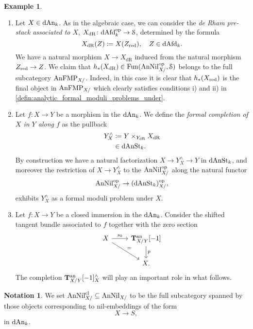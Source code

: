 \documentclass[10pt,a4paper,reqno]{amsart} %
\theoremstyle{plain}
\theoremstyle{definition}
\newtheorem{notation}[thm]{Notation}
\newtheorem{eg}[thm]{Example}
\theoremstyle{remark}
\numberwithin{equation}{section}
\begin{document}
\begin{eg}
    \begin{enumerate}
        \item Let $X \in \mathrm{dAn}_k$. As in the algebraic case, we can consider the \emph{de Rham pre-stack associated to $X$}, $X_\mathrm{dR} \colon \mathrm{dAfd}_k^\mathrm{op} \to \mathcal S$,
        determined by the formula
            \[
                X_{\mathrm{dR}}(Z) \coloneqq X(Z_{\mathrm{red}}), \quad Z \in \mathrm{dAfd}_k.  
            \]
        We have a natural morphism $X \to X_\mathrm{dR}$ induced from the natural morphism $Z_{\mathrm{red}} \to Z$.
        We claim that $h_*(X_\mathrm{dR}) \in \operatorname{Fun}(\mathrm{AnNil}_{X/}^\mathrm{op}, \mathcal S)$ belongs to the full subcategory $\mathrm{AnFMP}_{X/}$. Indeed, in this case it is clear that
        $h_*(X_{\mathrm{red}})$ is the final object in $\mathrm{AnFMP}_{X/}$ which clearly satisfies conditions i) and ii) in \cref{defin:analytic_formal_moduli_problems_under}.
        \item Let $f \colon X \to Y$ be a morphism in the \infcat $\mathrm{dAn}_k$. We define the \emph{formal completion of $X$ in $Y$ along $f$} as the pullback 
            \begin{align*}
                Y^\wedge_X  & \coloneqq Y \times_{Y_\mathrm{dR}} X_\mathrm{dR} \\
                            & \in \mathrm{dAnSt}_k.
            \end{align*}
        By construction we have a natural factorization $X \to Y^\wedge_X \to Y$ in $\mathrm{dAnSt}_k$, and moreover the restriction of $X \to Y^\wedge_X$ to the \infcat
        $\mathrm{AnNil}^\mathrm{op}_{X/}$ along the natural functor
            \[
                \mathrm{AnNil}^\mathrm{op}_{X/ } \to (\mathrm{dAnSt}_k)_{X/ } ^\mathrm{op},  
            \]
        exhibits $Y^\wedge_X$ as a formal moduli problem under $X$.
        \item Let $f \colon X \to Y$ be a closed immersion in the \infcat $\mathrm{dAn}_k$. Consider the shifted tangent bundle associated to $f$ together with the zero section
            \[
            \begin{tikzcd}
                X \ar{r}{s_0} \ar{rd}{=} & \bT\an_{X/ Y}[-1] \ar{d}{p} \\
                    & X.
            \end{tikzcd}
            \]
        The completion $\mathbf T^\mathrm{an}_{X/Y} [-1]^\wedge_X$ will play an important role in what follows.
    \end{enumerate}
\end{eg}

\begin{notation}
    We set $\mathrm{AnNil}_{X/}^{\mathrm{cl}} \subseteq \mathrm{AnNil}_{X/}$ to be the full subcategory spanned by those objects corresponding to nil-embeddings of the form
        \[
            X \to S,  
        \]
    in $\mathrm{dAn}_k$.
\end{notation}
\end{document}
